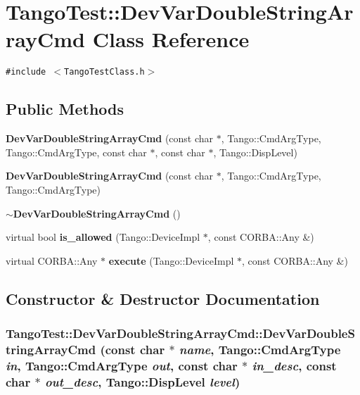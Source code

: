 \section{Tango\-Test::Dev\-Var\-Double\-String\-Array\-Cmd  Class Reference}
\label{classTangoTest_1_1DevVarDoubleStringArrayCmd}
{\tt \#include $<$Tango\-Test\-Class.h$>$}

\subsection*{Public Methods}
\begin{CompactItemize}
\item 
{\bf Dev\-Var\-Double\-String\-Array\-Cmd} (const char $\ast$, Tango::Cmd\-Arg\-Type, Tango::Cmd\-Arg\-Type, const char $\ast$, const char $\ast$, Tango::Disp\-Level)
\item 
{\bf Dev\-Var\-Double\-String\-Array\-Cmd} (const char $\ast$, Tango::Cmd\-Arg\-Type, Tango::Cmd\-Arg\-Type)
\item 
{\bf $\sim$Dev\-Var\-Double\-String\-Array\-Cmd} ()
\item 
virtual bool {\bf is\_\-allowed} (Tango::Device\-Impl $\ast$, const CORBA::Any \&)
\item 
virtual CORBA::Any $\ast$ {\bf execute} (Tango::Device\-Impl $\ast$, const CORBA::Any \&)
\end{CompactItemize}


\subsection{Constructor \& Destructor Documentation}
\subsubsection{\setlength{\rightskip}{0pt plus 5cm}Tango\-Test::Dev\-Var\-Double\-String\-Array\-Cmd::Dev\-Var\-Double\-String\-Array\-Cmd (const char $\ast$ {\em name}, Tango::Cmd\-Arg\-Type {\em in}, Tango::Cmd\-Arg\-Type {\em out}, const char $\ast$ {\em in\_\-desc}, const char $\ast$ {\em out\_\-desc}, Tango::Disp\-Level {\em level})}\label{classTangoTest_1_1DevVarDoubleStringArrayCmd_a0}


